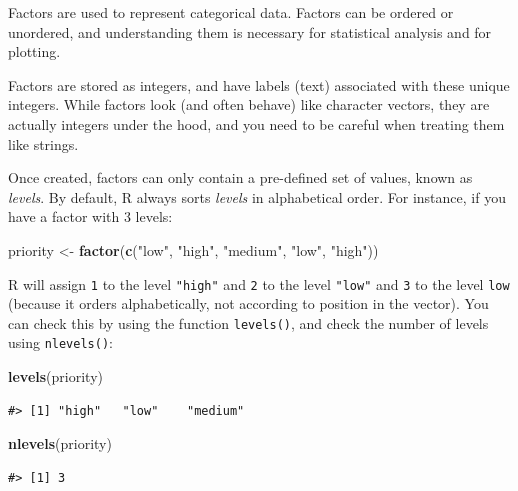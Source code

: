 \documentclass[
]{book}
\newenvironment{Shaded}{\begin{snugshade}}{\end{snugshade}}
\newcommand{\FunctionTok}[1]{\textcolor[rgb]{0.13,0.29,0.53}{\textbf{#1}}}
\newcommand{\NormalTok}[1]{#1}
\newcommand{\OtherTok}[1]{\textcolor[rgb]{0.56,0.35,0.01}{#1}}
\newcommand{\StringTok}[1]{\textcolor[rgb]{0.31,0.60,0.02}{#1}}
\begin{document}
Factors are used to represent categorical data. Factors can be ordered or
unordered, and understanding them is necessary for statistical analysis and for
plotting.

Factors are stored as integers, and have labels (text) associated with these
unique integers. While factors look (and often behave) like character vectors,
they are actually integers under the hood, and you need to be careful when
treating them like strings.

Once created, factors can only contain a pre-defined set of values, known as
\emph{levels}. By default, R always sorts \emph{levels} in alphabetical order. For
instance, if you have a factor with 3 levels:

\begin{Shaded}
\begin{Highlighting}[]
\NormalTok{priority }\OtherTok{\textless{}{-}} \FunctionTok{factor}\NormalTok{(}\FunctionTok{c}\NormalTok{(}\StringTok{"low"}\NormalTok{, }\StringTok{"high"}\NormalTok{, }\StringTok{"medium"}\NormalTok{, }\StringTok{"low"}\NormalTok{, }\StringTok{"high"}\NormalTok{))}
\end{Highlighting}
\end{Shaded}

R will assign \texttt{1} to the level \texttt{"high"} and \texttt{2} to the level \texttt{"low"} and \texttt{3} to the level \texttt{low} (because it orders alphabetically, not according to position in the vector). You can check this by using the function \texttt{levels()}, and check the number of levels using \texttt{nlevels()}:

\begin{Shaded}
\begin{Highlighting}[]
\FunctionTok{levels}\NormalTok{(priority)}
\end{Highlighting}
\end{Shaded}

\begin{verbatim}
#> [1] "high"   "low"    "medium"
\end{verbatim}

\begin{Shaded}
\begin{Highlighting}[]
\FunctionTok{nlevels}\NormalTok{(priority)}
\end{Highlighting}
\end{Shaded}

\begin{verbatim}
#> [1] 3
\end{verbatim}
\end{document}

